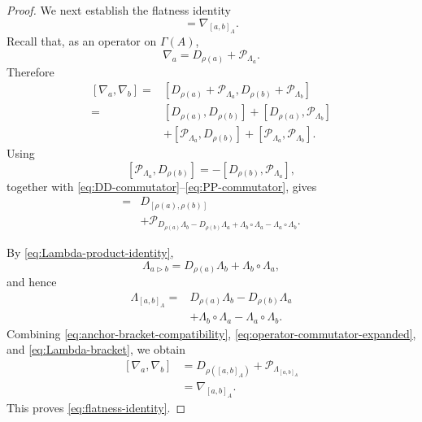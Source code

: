 \documentclass[12pt,reqno]{amsart}
\theoremstyle{definition}
\theoremstyle{remark}
\begin{document}
\begin{proof}
We next establish the flatness identity
\begin{equation}
[\nabla_a,\nabla_b]
=
\nabla_{[a,b]_A}.
\label{eq:flatness-identity}
\end{equation}
Recall that, as an operator on \(\Gamma(A)\), 
\[
\nabla_a
=
D_{\rho(a)}+\mathcal P_{\Lambda_a}.
\]
Therefore
\[
\begin{aligned}
[\nabla_a,\nabla_b]
={}&
[D_{\rho(a)}+\mathcal P_{\Lambda_a},
D_{\rho(b)}+\mathcal P_{\Lambda_b}]
\\
={}&
[D_{\rho(a)},D_{\rho(b)}]
+
[D_{\rho(a)},\mathcal P_{\Lambda_b}]
\\
&+
[\mathcal P_{\Lambda_a},D_{\rho(b)}]
+
[\mathcal P_{\Lambda_a},\mathcal P_{\Lambda_b}].
\end{aligned}
\]
Using
\[
[\mathcal P_{\Lambda_a},D_{\rho(b)}]
=
-[D_{\rho(b)},\mathcal P_{\Lambda_a}],
\]
together with
\eqref{eq:DD-commutator}--\eqref{eq:PP-commutator}, gives
\begin{align}
[\nabla_a,\nabla_b]
={}&
D_{[\rho(a),\rho(b)]}
\nonumber\\
&+
\mathcal P_{
D_{\rho(a)}\Lambda_b
-
D_{\rho(b)}\Lambda_a
+
\Lambda_b\circ\Lambda_a
-
\Lambda_a\circ\Lambda_b
}.
\label{eq:operator-commutator-expanded}
\end{align}

By \eqref{eq:Lambda-product-identity},
\[
\Lambda_{a\triangleright b}
=
D_{\rho(a)}\Lambda_b+\Lambda_b\circ\Lambda_a,
\]
and hence
\begin{align}
\Lambda_{[a,b]_A}
={}&
D_{\rho(a)}\Lambda_b
-
D_{\rho(b)}\Lambda_a
\nonumber\\
&+
\Lambda_b\circ\Lambda_a
-
\Lambda_a\circ\Lambda_b.
\label{eq:Lambda-bracket}
\end{align}
Combining \eqref{eq:anchor-bracket-compatibility},
\eqref{eq:operator-commutator-expanded}, and
\eqref{eq:Lambda-bracket}, we obtain
\[
\begin{aligned}
[\nabla_a,\nabla_b]
&=
D_{\rho([a,b]_A)}
+
\mathcal P_{\Lambda_{[a,b]_A}}
\\
&=
\nabla_{[a,b]_A}.
\end{aligned}
\]
This proves \eqref{eq:flatness-identity}.


\end{proof}
\end{document}
